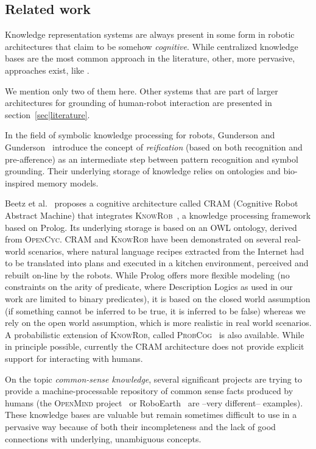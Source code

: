 \documentclass{svmult}
\begin{document}
\subsection{Related work}

Knowledge representation systems are always present in some form in robotic
architectures that claim to be somehow \emph{cognitive}. While centralized
knowledge bases are the most common approach in the literature, other, more
pervasive, approaches exist, like \cite{Jacobsson2008}.

We mention only two of them here. Other systems that are part of larger
architectures for grounding of human-robot interaction are presented in
section~\ref{sec|literature}.

In the field of symbolic knowledge processing for robots, Gunderson and
Gunderson~\cite{Gunderson2008} introduce the concept of \emph{reification}
(based on both recognition and pre-afference) as an intermediate step between
pattern recognition and symbol grounding. Their underlying storage of knowledge
relies on ontologies and bio-inspired memory models.

Beetz et al.~\cite{Beetz2010} proposes a cognitive architecture called
\textsc{CRAM} (Cognitive Robot Abstract Machine) that integrates
\textsc{KnowRob}~\cite{Tenorth2009a}, a knowledge processing framework based on
Prolog. Its underlying storage is based on an OWL ontology, derived from
\textsc{OpenCyc}. \textsc{CRAM} and \textsc{KnowRob} have been demonstrated on
several real-world scenarios, where natural language recipes extracted from the
Internet had to be translated into plans and executed in a kitchen environment,
perceived and rebuilt on-line by the robots. While Prolog offers more flexible
modeling (no constraints on the arity of predicate, where Description Logics as
used in our work are limited to binary predicates), it is based on the closed
world assumption (if something cannot be inferred to be true, it is inferred to
be false) whereas we rely on the open world assumption, which is more realistic
in real world scenarios. A probabilistic extension of \textsc{KnowRob}, called
\textsc{ProbCog}~\cite{Jain2009} is also available. While in principle
possible, currently the CRAM architecture does not provide explicit support for
interacting with humans.

On the topic \emph{common-sense knowledge}, several significant projects are
trying to provide a machine-processable repository of common sense facts
produced by humans (the \textsc{OpenMind} project~\cite{Singh2002} or
RoboEarth~\cite{Waibel2011} are --very different-- examples). These knowledge
bases are valuable but remain sometimes difficult to use in a pervasive way
because of both their incompleteness and the lack of good connections with
underlying, unambiguous concepts.
\end{document}

